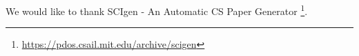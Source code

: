 \begin{acknowledgements}
	We would like to thank SCIgen - An Automatic CS Paper Generator%
	\footnote{\url{https://pdos.csail.mit.edu/archive/scigen}}.
\end{acknowledgements}
